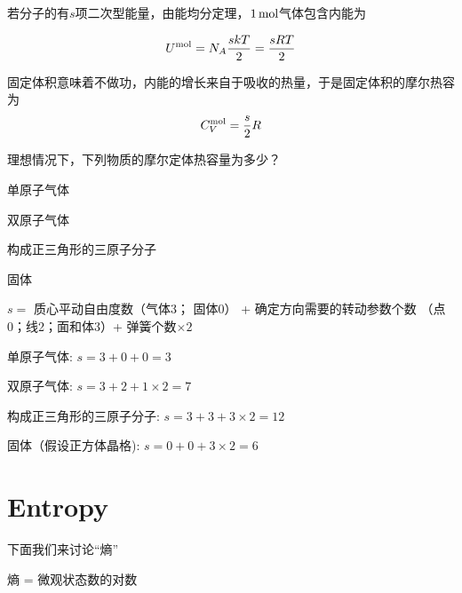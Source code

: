 \documentclass[CJK]{beamer}
\begin{document}
\begin{frame}
\bch
若分子的有$s$项二次型能量，由能均分定理，$1\,\mathrm{mol}$气体包含内能为

$$U^{\rm mol} = N_A \frac{skT}{2} = \frac{sRT}{2}$$

固定体积意味着不做功，内能的增长来自于吸收的热量，于是固定体积的摩尔热容为
$$C_V^{\rm mol} = \frac{s}{2} R$$
\ech
\end{frame}

\begin{frame}
\bch
理想情况下，下列物质的摩尔定体热容量为多少？

\bitem
\item{单原子气体}
\item{双原子气体}
\item{构成正三角形的三原子分子}
\item{固体}
\eitem
\ech
\end{frame}

\begin{frame}
\bch
$s =$ 质心平动自由度数（气体3； 固体0） + 确定方向需要的转动参数个数 （点0；线2；面和体3）+ 弹簧个数$\times 2$  

\bitem
\item{单原子气体: $s = 3 + 0 + 0 = 3$}
\item{双原子气体: $s = 3 + 2 + 1\times 2 = 7$}
\item{构成正三角形的三原子分子: $s = 3 + 3 + 3\times 2 = 12$}
\item{固体（假设正方体晶格): $s = 0 + 0 + 3 \times 2 = 6$}
\eitem
\ech
\end{frame}

\section{Entropy}


\begin{frame}
\bch
下面我们来讨论“熵”
\ech
\end{frame}



\begin{frame}
\bch
{}
\emini
{}
熵 = 微观状态数的对数
\emini
\ech
\end{frame}
\end{document}
